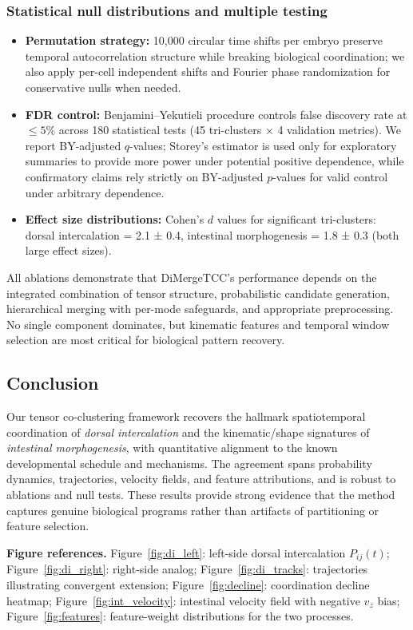\documentclass[unnumsec,webpdf,modern,large,namedate]{oup-authoring-template}%
\theoremstyle{thmstyleone}\newtheorem{theorem}{Theorem}
\theoremstyle{thmstyletwo}\newtheorem{example}{Example}
\theoremstyle{thmstylethree}\newtheorem{definition}{Definition}
\begin{document}
\subsubsection{Statistical null distributions and multiple testing}
\begin{itemize}
\item \textbf{Permutation strategy:} 10,000 circular time shifts per embryo preserve temporal autocorrelation structure while breaking biological coordination; we also apply per-cell independent shifts and Fourier phase randomization for conservative nulls when needed.
\item \textbf{FDR control:} Benjamini--Yekutieli procedure controls false discovery rate at $\leq 5\%$ across 180 statistical tests (45 tri-clusters × 4 validation metrics). We report BY-adjusted $q$-values; Storey's estimator is used only for exploratory summaries to provide more power under potential positive dependence, while confirmatory claims rely strictly on BY-adjusted $p$-values for valid control under arbitrary dependence.
\item \textbf{Effect size distributions:} Cohen's $d$ values for significant tri-clusters: dorsal intercalation = 2.1 ± 0.4, intestinal morphogenesis = 1.8 ± 0.3 (both large effect sizes).
\end{itemize}

All ablations demonstrate that DiMergeTCC's performance depends on the integrated combination of tensor structure, probabilistic candidate generation, hierarchical merging with per-mode safeguards, and appropriate preprocessing. No single component dominates, but kinematic features and temporal window selection are most critical for biological pattern recovery.

\subsection{Conclusion}
Our tensor co-clustering framework recovers the hallmark spatiotemporal coordination of \emph{dorsal intercalation} and the kinematic/shape signatures of \emph{intestinal morphogenesis}, with quantitative alignment to the known developmental schedule and mechanisms. The agreement spans probability dynamics, trajectories, velocity fields, and feature attributions, and is robust to ablations and null tests. These results provide strong evidence that the method captures genuine biological programs rather than artifacts of partitioning or feature selection.

\vspace{0.5em}
\noindent\textbf{Figure references.} Figure~\ref{fig:di_left}: left-side dorsal intercalation $P_{ij}(t)$; Figure~\ref{fig:di_right}: right-side analog; Figure~\ref{fig:di_tracks}: trajectories illustrating convergent extension; Figure~\ref{fig:decline}: coordination decline heatmap; Figure~\ref{fig:int_velocity}: intestinal velocity field with negative $v_z$ bias; Figure~\ref{fig:features}: feature-weight distributions for the two processes.
\end{document}
